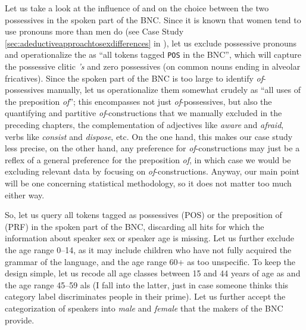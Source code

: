 Let us take a look at the influence of  and  on the choice between the two possessives  in the spoken  part of the BNC.  Since it is known that women tend to use pronouns  more than men do (see Case Study \ref{sec:adeductiveapproachtosexdifferences} in ), let us exclude possessive pronouns and operationalize  the  as ``all tokens tagged  \texttt{POS} in the BNC'',  which will capture the possessive clitic  \textit{'s} and zero possessives (on common nouns  ending in alveolar fricatives). Since the spoken  part of the BNC is too large to identify \textit{of}-possessives manually,  let us operationalize  them somewhat crudely as ``all uses of the preposition  \textit{of}''; this encompasses not just \textit{of}-possessives,  but also the quantifying and partitive \textit{of}-constructions that we manually  excluded in the preceding chapters, the complementation of adjectives  like \textit{aware} and \textit{afraid}, verbs  like \textit{consist} and \textit{dispose}, etc. On the one hand, this makes our case study less precise, on the other hand, any preference for \textit{of}-constructions may just be a reflex of a general preference for the preposition  \textit{of}, in which case we would be excluding relevant data by focusing on \textit{of}-constructions. Anyway, our main point will be one concerning statistical methodology, so it does not matter too much either way.

So, let us query all tokens tagged  as possessives  (POS) or the preposition  of (PRF) in the spoken  part of the BNC,  discarding all hits for which the information about speaker sex or speaker age  is missing. Let us further exclude the age  range 0--14, as it may include children who have not fully acquired  the grammar of the language, and the age  range 60+ as too unspecific. To keep the design  simple, let us recode all age  classes between 15 and 44 years of age  as  and the age  range 45--59 als  (I fall into the latter, just in case someone thinks this category label discriminates people in their prime). Let us further accept the categorization  of speakers into \textit{male} and \textit{female} that the makers of the BNC  provide.

